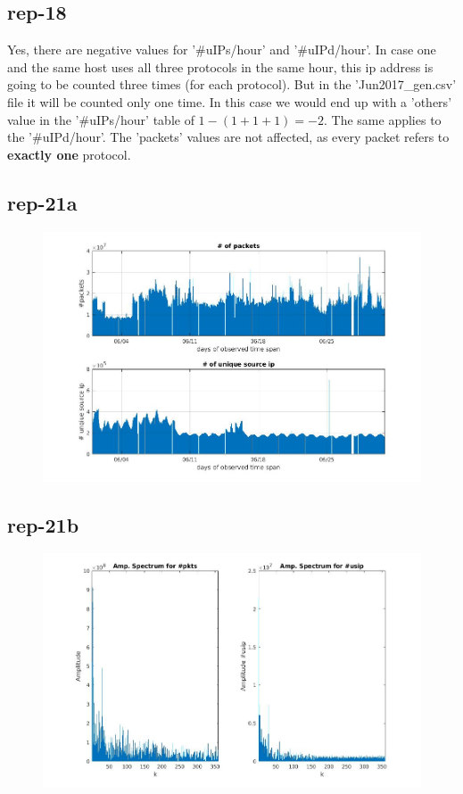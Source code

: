 \subsection*{rep-18}
Yes, there are negative values for '\#uIPs/hour' and '\#uIPd/hour'. In case one and the same host uses all three protocols in the same hour, this ip address is going to be counted three times (for each protocol). But in the 'Jun2017\_gen.csv' file it will be counted only one time. In this case we would end up with a 'others' value in the '\#uIPs/hour' table of $1 - (1+1+1) = -2$. The same applies to the '\#uIPd/hour'. The 'packets' values are not affected, as every packet refers to \textbf{exactly one} protocol.

\subsection*{rep-21a}
\begin{figure}[H]
\center
\includegraphics[width=.7\textwidth]{./chapters/plots/rep21a.jpg}\\
\caption{}
\end{figure}

\subsection*{rep-21b}
\begin{figure}[H]
\center
\includegraphics[width=.7\textwidth]{./chapters/plots/rep21b.jpg}\\
\caption{}
\end{figure}

